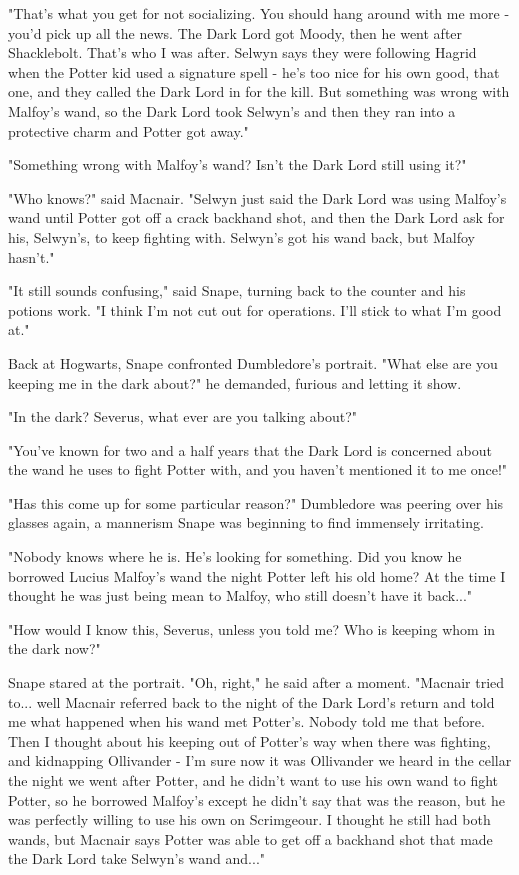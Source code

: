 "That's what you get for not socializing. You should hang around with me more - you'd pick up all the news. The Dark Lord got Moody, then he went after Shacklebolt. That's who I was after. Selwyn says they were following Hagrid when the Potter kid used a signature spell - he's too nice for his own good, that one, and they called the Dark Lord in for the kill. But something was wrong with Malfoy's wand, so the Dark Lord took Selwyn's and then they ran into a protective charm and Potter got away."

"Something wrong with Malfoy's wand? Isn't the Dark Lord still using it?"

"Who knows?" said Macnair. "Selwyn just said the Dark Lord was using Malfoy's wand until Potter got off a crack backhand shot, and then the Dark Lord ask for his, Selwyn's, to keep fighting with. Selwyn's got his wand back, but Malfoy hasn't."

"It still sounds confusing," said Snape, turning back to the counter and his potions work. "I think I'm not cut out for operations. I'll stick to what I'm good at."

Back at Hogwarts, Snape confronted Dumbledore's portrait. "What else are you keeping me in the dark about?" he demanded, furious and letting it show.

"In the dark? Severus, what ever are you talking about?"

"You've known for two and a half years that the Dark Lord is concerned about the wand he uses to fight Potter with, and you haven't mentioned it to me once!"

"Has this come up for some particular reason?" Dumbledore was peering over his glasses again, a mannerism Snape was beginning to find immensely irritating.

"Nobody knows where he is. He's looking for something. Did you know he borrowed Lucius Malfoy's wand the night Potter left his old home? At the time I thought he was just being mean to Malfoy, who still doesn't have it back..."

"How would I know this, Severus, unless you told me? Who is keeping whom in the dark now?"

Snape stared at the portrait. "Oh, right," he said after a moment. "Macnair tried to... well Macnair referred back to the night of the Dark Lord's return and told me what happened when his wand met Potter's. Nobody told me that before. Then I thought about his keeping out of Potter's way when there was fighting, and kidnapping Ollivander - I'm sure now it was Ollivander we heard in the cellar the night we went after Potter, and he didn't want to use his own wand to fight Potter, so he borrowed Malfoy's except he didn't say that was the reason, but he was perfectly willing to use his own on Scrimgeour. I thought he still had both wands, but Macnair says Potter was able to get off a backhand shot that made the Dark Lord take Selwyn's wand and..."

